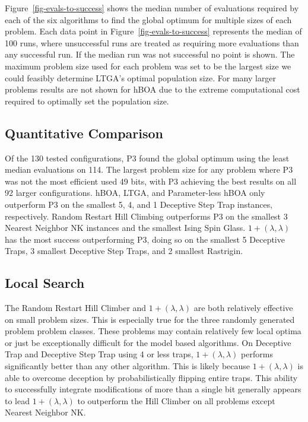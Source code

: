 \documentclass[twoside]{article}
\begin{document}
Figure~\ref{fig-evals-to-success} shows the median number of evaluations required by each of the six
algorithms to find the global optimum for multiple sizes of each problem.  Each data point in
Figure~\ref{fig-evals-to-success} represents the median of 100 runs, where unsuccessful runs
are treated as requiring more evaluations than any successful run. If the median run was not successful
no point is shown. The maximum problem size used for each problem was set to be the largest size we could
feasibly determine LTGA's optimal population size. For many larger problems results are not shown
for hBOA due to the extreme computational cost required to optimally set the population size.

\subsection{Quantitative Comparison}
Of the 130 tested configurations, P3 found the global optimum using the least median evaluations on 114.
The largest problem size for any problem where P3 was not the most efficient used 49 bits, with P3 achieving the best results on all 92 larger
configurations. hBOA, LTGA, and Parameter-less hBOA only outperform P3 on the smallest 5, 4, and 1 Deceptive
Step Trap instances, respectively. Random Restart Hill Climbing outperforms P3 on the smallest 3 Nearest Neighbor NK instances
and the smallest Ising Spin Glass. $1+(\lambda, \lambda)$ has the most success outperforming P3, doing so
on the smallest 5 Deceptive Traps, 3 smallest Deceptive Step Traps, and 2 smallest Rastrigin.

\subsection{Local Search}
The Random Restart Hill Climber and $1+(\lambda, \lambda)$ are both relatively effective on small problem
sizes. This is especially true for the three randomly generated problem problem classes. These problems
may contain relatively few local optima or just be exceptionally difficult for the model based algorithms.
On Deceptive Trap and Deceptive Step Trap using 4 or less traps, $1+(\lambda, \lambda)$ performs significantly
better than any other algorithm. This is likely
because $1+(\lambda, \lambda)$ is able to overcome deception by probabilistically
flipping entire traps.
This ability to successfully integrate modifications of more than a single bit generally appears to lead $1+(\lambda, \lambda)$
to outperform the Hill Climber on all problems except Nearest Neighbor NK.
\end{document}
